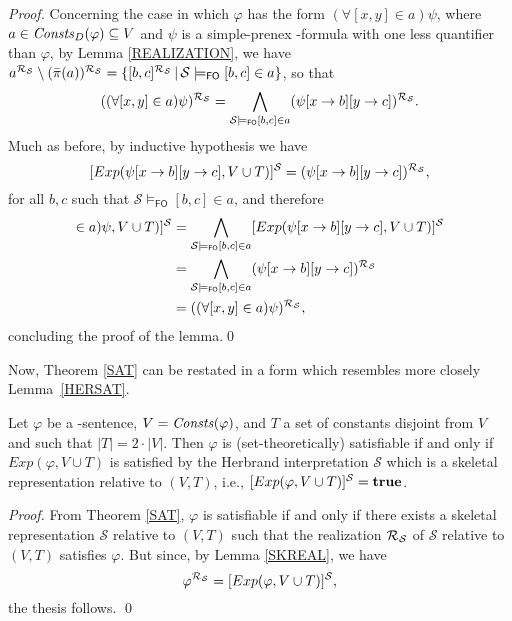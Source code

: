 \documentclass[a4paper]{llncs}
\newcommand{\HExp}{Exp}
\newcommand{\nonpairssym}{\bar{\pi}}
\newcommand{\nonpairs}[1]{\nonpairssym(#1)}
\newcommand{\atset}{\mathcal{S}}
\newcommand{\DomConsts}{\Consts_D}
\newcommand{\consta}{a}
\newcommand{\constb}{b}
\newcommand{\constc}{c}
\newcommand{\subst}[3]{#1[#2\rightarrow#3]}
\newcommand{\fomodels}[2]{#1 \models_{\mathsf{FO}} #2}
\begin{document}
\begin{proof}
Concerning the case in which $\varphi$ has the form
$(\forall [x,y] \in \consta)\psi$, where $a \in \DomConsts(\varphi) 
\subseteq V$ and $\psi$ is a simple-prenex \Forallpizero-formula with 
one less quantifier than $\varphi$, by Lemma \ref{REALIZATION}, we 
have
$\consta^{\Realization_{\!\atset}}
\setminus (\nonpairs{\consta})^{\Realization_{\!\atset}}=\{ [\constb, 
\constc]^{\Realization_{\!\atset}} \,|\,
\fomodels{\atset}{[\constb, \constc] \in \consta} \}$, so that
\[
((\forall [x,y] \in \consta)\psi)^{\Realization_{\!\atset}} = 
\bigwedge\limits_{\fomodels{\atset}{[\constb, \constc] \in\consta}} 
(\subst{\subst{\psi}{x}{\constb}}{y}{\constc})^{\Realization_{\!\atset}}. 
\]
Much as before, by inductive hypothesis we have
\[
   [\HExp(\subst{\subst{\psi}{x}{\constb}}{y}{\constc}, V \cup 
T)]^{\atset} = 
(\subst{\subst{\psi}{x}{\constb}}{y}{\constc})^{\Realization_{\!\atset}} 
,
\]
for all $b,c$ such that $\fomodels{\atset}{[\constb, \constc] 
\in\consta}$, and therefore
\begin{align*}
  [\HExp((\forall [x,y] \in \consta)\psi, V \cup T)]^{\atset} &=
  \bigwedge\limits_{\fomodels{\atset}{[\constb, \constc] 
\in\consta}}[\HExp(\subst{\subst{\psi}{x}{\constb}}{y}{\constc}, V 
\cup T)]^{\atset}  \\
&=  \bigwedge\limits_{\fomodels{\atset}{[\constb, \constc] 
\in\consta}} 
(\subst{\subst{\psi}{x}{\constb}}{y}{\constc})^{\Realization_{\!\atset}}\\
&= ((\forall [x,y] \in \consta)\psi)^{\Realization_{\!\atset}} ,
\end{align*}
concluding the proof of the lemma.\qed
\end{proof}
%
Now, Theorem \ref{SAT} can be restated in a form which resembles more closely
Lemma~\ref{HERSAT}.

\begin{corollary}\label{SATEXP}
Let $\varphi$ be a \Forallpizero-sentence, $V=\mathit{Consts}(\varphi)$,
and $T$ a set of constants disjoint from $V$ and such that
$|T|=2\cdot|V|$. Then $\varphi$ is (set-theoretically) satisfiable
if and only if $\HExp(\varphi, V\cup T)$ is satisfied by the Herbrand 
interpretation
$\atset$ which is a skeletal representation
relative to $(V,T)$, i.e., $[\HExp(\varphi, V\cup T)]^\atset = \true$.
\end{corollary}
\begin{proof}
 From Theorem \ref{SAT}, $\varphi$ is satisfiable if and only if
there exists a skeletal representation $\atset$
relative to $(V,T)$ such that the realization $\Realization_{\!\atset}$
of $\atset$ relative to $(V,T)$ satisfies $\varphi$. But since, by 
Lemma \ref{SKREAL}, we have
\[
  \varphi^{\Realization_{\!\atset}} = [\HExp(\varphi, V \cup T)]^{\atset},
\]
the thesis follows. \qed
\end{proof}
\end{document}
